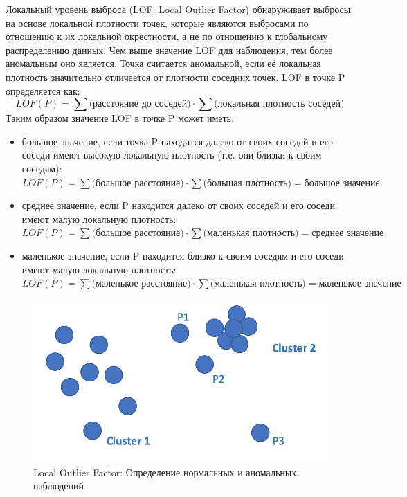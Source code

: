 \documentclass[12pt]{article}
\begin{document}
    Локальный уровень выброса (LOF: Local Outlier Factor) обнаруживает выбросы на основе локальной плотности точек, которые являются выбросами по отношению к их локальной окрестности, а не по отношению к глобальному распределению данных. Чем выше значение LOF для наблюдения, тем более аномальным оно является. Точка считается аномальной, если её локальная плотность значительно отличается от плотности соседних точек. LOF в точке P определяется как:
    $$
    LOF(P) = \sum \text{(расстояние до соседей)} \cdot \sum \text{(локальная плотность соседей)}
    $$
    Таким образом значение LOF в точке P может иметь:
    \begin{itemize}
        \item большое значение, если точка P находится далеко от своих соседей и его соседи имеют высокую локальную плотность (т.е. они близки к своим соседям): \\ 
        $ LOF(P) = \sum {\text{(большое расстояние)}} \cdot \sum \text{(большая плотность)} = \text{большое значение}$
        \item среднее значение, если P находится далеко от своих соседей и его соседи имеют малую локальную плотность: \\
        $ LOF(P) = \sum \text{(большое расстояние)} \cdot \sum \text{(маленькая плотность)} = \text{среднее значение} $
        \item маленькое значение, если P находится близко к своим соседям и его соседи имеют малую локальную плотность: \\
        $ LOF(P) = \sum \text{(маленькое расстояние)} \cdot \sum \text{(маленькая плотность)} = \text{маленькое значение} $
    \end{itemize}
    
    \begin{figure}[h]
        \centering
        \includegraphics[width=\linewidth]{LocalOutlierFactor.png}
        \caption{Local Outlier Factor: Определение нормальных и аномальных наблюдений}
        \label{sec:Research:Model:LocalOutlierFactor:fig:LocalOutlierFactor}
    \end{figure}
\end{document}
